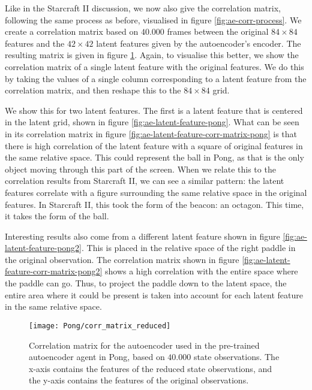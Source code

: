 Like in the Starcraft II discussion, we now also give the correlation matrix, following the same process as before, visualised in figure \ref{fig:ae-corr-process}. We create a correlation matrix based on $40.000$ frames between the original $84 \times 84$ features and the $42 \times 42$ latent features given by the autoencoder's encoder. The resulting matrix is given in figure \ref{fig:ae-corr-pong}. Again, to visualise this better, we show the correlation matrix of a single latent feature with the original features. We do this by taking the values of a single column corresponding to a latent feature from the correlation matrix, and then reshape this to the $84 \times 84$ grid.

We show this for two latent features. The first is a latent feature that is centered in the latent grid, shown in figure \ref{fig:ae-latent-feature-pong}. What can be seen in its correlation matrix in figure \ref{fig:ae-latent-feature-corr-matrix-pong} is that there is high correlation of the latent feature with a square of original features in the same relative space. This could represent the ball in Pong, as that is the only object moving through this part of the screen. When we relate this to the correlation results from Starcraft II, we can see a similar pattern: the latent features correlate with a figure surrounding the same relative space in the original features. In Starcraft II, this took the form of the beacon: an octagon. This time, it takes the form of the ball.

Interesting results also come from a different latent feature shown in figure \ref{fig:ae-latent-feature-pong2}. This is placed in the relative space of the right paddle in the original observation. The correlation matrix shown in figure \ref{fig:ae-latent-feature-corr-matrix-pong2} shows a high correlation with the entire space where the paddle can go. Thus, to project the paddle down to the latent space, the entire area where it could be present is taken into account for each latent feature in the same relative space.

\begin{figure}[h]
	\centering
	\texttt{[image: Pong/corr\_matrix\_reduced]}
	\caption{Correlation matrix for the autoencoder used in the pre-trained autoencoder agent in Pong, based on $40.000$ state observations. The x-axis contains the features of the reduced state observations, and the y-axis contains the features of the original observations.}
	\label{fig:ae-corr-pong}
\end{figure}

